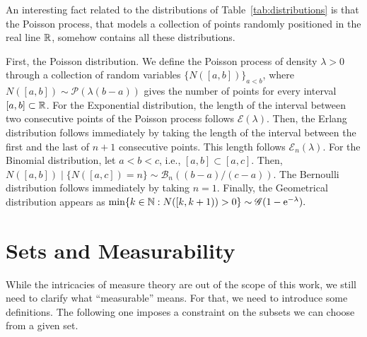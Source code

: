 \begin{note}
    An interesting fact related to the distributions of Table~\ref{tab:distributions} is that the Poisson process, that models a collection of points randomly positioned in the real line ${\mathbb R}$, somehow contains all these distributions.
    
    First, the Poisson distribution. We define the Poisson process of density $\lambda>0$ through a collection of random variables $\{N([a,b])\}_{a<b}$, where $N([a,b])\sim\mathscr{P}(\lambda(b-a))$ gives the number of points for every interval $[a,b] \subset {\mathbb R}$.
    For the Exponential distribution, the length of the interval between two consecutive points of the Poisson process follows $\mathscr{E}(\lambda)$.
    Then, the Erlang distribution follows immediately by taking the length of the interval between the first and the last of $n+1$ consecutive points. This length follows $\mathscr{E}_n(\lambda)$.
    For the Binomial distribution, let $a<b<c$, i.e., $[a,b]\subset[a,c]$. Then, $N([a,b])\mid \{N([a,c])=n\} \sim \mathscr{B}_n((b-a)/(c-a)).$
    The Bernoulli distribution follows immediately by taking $n=1$.
    Finally, the Geometrical distribution appears as
    $\min\{k\in{\mathbb N} : N([k,k+1)) > 0\} \sim \mathscr{G}(1-\mathrm{e}^{-\lambda}).$
\end{note}

\section{Sets and Measurability}


While the intricacies of measure theory are out of the scope of this work, we still need to clarify what ``measurable'' means.
%
For that, we need to introduce some definitions. The following one imposes a constraint on the subsets we can choose from a given set.


